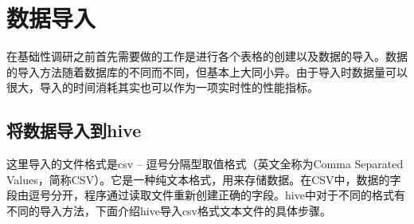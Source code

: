 \section{数据导入}
在基础性调研之前首先需要做的工作是进行各个表格的创建以及数据的导入。数据的导入方法随着数据库的不同而不同，但基本上大同小异。由于导入时数据量可以很大，导入的时间消耗其实也可以作为一项实时性的性能指标。

\subsection{将数据导入到hive}
  这里导入的文件格式是csv -- 逗号分隔型取值格式（英文全称为Comma Separated Values，简称CSV）。它是一种纯文本格式，用来存储数据。在CSV中，数据的字段由逗号分开，程序通过读取文件重新创建正确的字段。hive中对于不同的格式有不同的导入方法，下面介绍hive导入csv格式文本文件的具体步骤。

